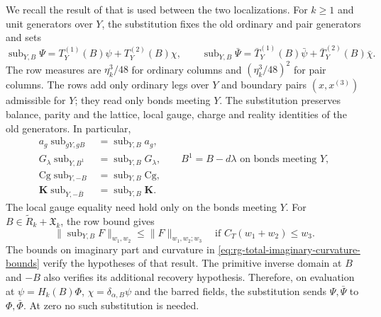 We recall the result of \cite[Theorem~B(iii)--(iv)]{NormalizedContraction}
that is used between the two localizations. For $k\ge1$ and unit
generators over $Y$, the substitution fixes the old ordinary and
pair generators and sets
\begin{equation}\label{eq:rg-step-local-substitution}
 \operatorname{sub}_{Y,B}\Psi=T_Y^{(1)}(B)\psi+T_Y^{(2)}(B)\chi,
 \qquad
 \operatorname{sub}_{Y,B}\bar\Psi=
              \bar T_Y^{(1)}(B)\bar\psi+\bar T_Y^{(2)}(B)\bar\chi.
\end{equation}
The row measures are $\eta_k^3/48$ for ordinary columns and
$(\eta_k^3/48)^2$ for pair columns. The rows add only ordinary
legs over $Y$ and boundary pairs $(x,x^{(3)})$ admissible for $Y$;
they read only bonds meeting $Y$. The substitution preserves
balance, parity and the lattice, local gauge, charge and reality
identities of the old generators. In particular,
\begin{equation}\label{eq:rg-step-substitution-covariances}
 \begin{split}
 a_g\operatorname{sub}_{gY,gB}
                        &=\operatorname{sub}_{Y,B}a_g,\\
 G_\lambda\operatorname{sub}_{Y,B^1}
                        &=\operatorname{sub}_{Y,B}G_\lambda,
                 \qquad B^1=B-d\lambda\text{ on bonds meeting }Y,\\
 \mathrm{Cg}\operatorname{sub}_{Y,-B}
                        &=\operatorname{sub}_{Y,B}\mathrm{Cg},\\
 \mathbf K\operatorname{sub}_{Y,-\overline B}
                        &=\operatorname{sub}_{Y,B}\mathbf K.
 \end{split}
\end{equation}
The local gauge equality need hold only on the bonds meeting $Y$.
For $B\in\widetilde R_k+\mathfrak X_k$, the row bound gives
\begin{equation}\label{eq:rg-step-substitution-bound}
 \|\operatorname{sub}_{Y,B}F\|_{w_1,w_2}
       \le\|F\|_{w_1,w_2;w_3}
       \quad\text{if }C_T(w_1+w_2)\le w_3.
\end{equation}
The bounds on imaginary part and curvature in
\eqref{eq:rg-total-imaginary-curvature-bounds} verify the hypotheses
of that result. The primitive inverse domain at $B$ and $-B$
also verifies its additional recovery hypothesis. Therefore, on
evaluation at $\psi=H_k(B)\Phi$, $\chi=\delta_{\alpha,B}\psi$ and
the barred fields, the substitution sends $\Psi,\bar\Psi$ to
$\Phi,\bar\Phi$. At zero no such substitution is needed.

